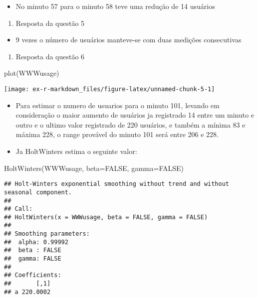 \documentclass[
]{article}
\newenvironment{Shaded}{\begin{snugshade}}{\end{snugshade}}
\newcommand{\AttributeTok}[1]{\textcolor[rgb]{0.77,0.63,0.00}{#1}}
\newcommand{\ConstantTok}[1]{\textcolor[rgb]{0.00,0.00,0.00}{#1}}
\newcommand{\FunctionTok}[1]{\textcolor[rgb]{0.00,0.00,0.00}{#1}}
\newcommand{\NormalTok}[1]{#1}
\providecommand{\tightlist}{%
  \setlength{\itemsep}{0pt}\setlength{\parskip}{0pt}}
\begin{document}
\begin{itemize}
\tightlist
\item
  No minuto 57 para o minuto 58 teve uma redução de 14 usuários
\end{itemize}

\begin{enumerate}
\def\labelenumi{\arabic{enumi}.}
\setcounter{enumi}{4}
\tightlist
\item
  Resposta da questão 5
\end{enumerate}

\begin{itemize}
\tightlist
\item
  9 vezes o número de usuários manteve-se com duas medições consecutivas
\end{itemize}

\begin{enumerate}
\def\labelenumi{\arabic{enumi}.}
\setcounter{enumi}{5}
\tightlist
\item
  Resposta da questão 6
\end{enumerate}

\begin{Shaded}
\begin{Highlighting}[]
\FunctionTok{plot}\NormalTok{(WWWusage)}
\end{Highlighting}
\end{Shaded}

\begin{center}\texttt{[image: ex-r-markdown\_files/figure-latex/unnamed-chunk-5-1]} \end{center}

\begin{itemize}
\tightlist
\item
  Para estimar o numero de usuarios para o minuto 101, levando em
  consideração o maior aumento de usuários ja registrado 14 entre um
  minuto e outro e o ultimo valor registrado de 220 usuários, e também a
  mínima 83 e máxima 228, o range provável do minuto 101 será entre 206
  e 228.
\item
  Ja HoltWinters estima o seguinte valor:
\end{itemize}

\begin{Shaded}
\begin{Highlighting}[]
\FunctionTok{HoltWinters}\NormalTok{(WWWusage, }\AttributeTok{beta=}\ConstantTok{FALSE}\NormalTok{, }\AttributeTok{gamma=}\ConstantTok{FALSE}\NormalTok{)}
\end{Highlighting}
\end{Shaded}

\begin{verbatim}
## Holt-Winters exponential smoothing without trend and without seasonal component.
## 
## Call:
## HoltWinters(x = WWWusage, beta = FALSE, gamma = FALSE)
## 
## Smoothing parameters:
##  alpha: 0.99992
##  beta : FALSE
##  gamma: FALSE
## 
## Coefficients:
##       [,1]
## a 220.0002
\end{verbatim}
\end{document}
